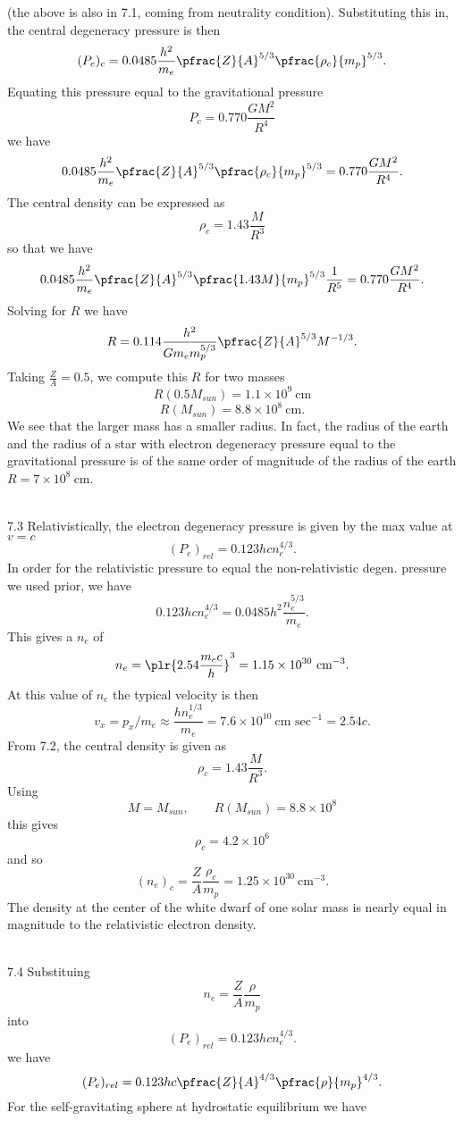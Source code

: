 \documentclass[10pt,letterpaper]{article}
\begin{document}
(the above is also in 7.1, coming from neutrality condition). Substituting this in, the central degeneracy pressure is then
\[
	(P_e)_c = 0.0485 \frac{h^2}{m_e} \pfrac{Z}{A}^{5/3} \pfrac{\rho_c}{m_p}^{5/3}.
\]
Equating this pressure equal to the gravitational pressure 
\[
	P_c = 0.770 \frac{GM^2}{R^4}
\]
we have
\[
	0.0485 \frac{h^2}{m_e} \pfrac{Z}{A}^{5/3} \pfrac{\rho_c}{m_p}^{5/3}= 0.770 \frac{GM^2}{R^4}.
\]
The central density can be expressed as
\[
	\rho_c = 1.43 \frac{M}{R^3}
\] so that we have
\[
	0.0485 \frac{h^2}{m_e} \pfrac{Z}{A}^{5/3} \pfrac{1.43 M}{m_p}^{5/3}\frac{1}{R^5}= 0.770 \frac{GM^2}{R^4}.
\]
Solving for $R$ we have
\[
	R = 0.114 \frac{h^2}{Gm_e m_p^{5/3}}\pfrac{Z}{A}^{5/3} M^{-1/3}.
\]
Taking $\frac ZA = 0.5$, we compute this $R$ for two masses
\[
	R(0.5M_{sun}) = 1.1\times 10^9\ \text{cm}
\]
\[
	R(M_{sun}) = 8.8\times 10^8\ \text{cm}.
\]
We see that the larger mass has a smaller radius. In fact, the radius of the earth and the radius of a star with electron degeneracy pressure equal to the gravitational pressure is of the same order of magnitude of the radius of the earth $R = 7\times10^{8}\ \text{cm}$. 
\\ \\
\item[7.3]
Relativistically, the electron degeneracy pressure is given by the max value at $v=c$
\[
	(P_e)_{rel} = 0.123 hc n_e^{4/3}.
\]
In order for the relativistic pressure to equal the non-relativistic degen. pressure we used prior, we have
\[
	 0.123 hc n_e^{4/3} = 0.0485 h^2 \frac{n_e^{5/3}}{m_e}.
\]
This gives a $n_e$ of
\[
	n_e = \plr{ 2.54 \frac{m_e c}{h}}^3 = 1.15\times 10^{30}\ \text{cm}^{-3}.
\]
At this value of $n_e$ the typical velocity is then 
\[
	v_x = p_x/m_e \approx \frac{h n_e^{1/3}}{m_e} = 7.6\times 10^{10}\ \text{cm sec}^{-1} = 2.54 c.
\]
From 7.2, the central density is given as
\[
	\rho_c = 1.43 \frac{M}{R^3}.
\]
Using 
\[
	M = M_{sun},\qquad R(M_{sun}) = 8.8\times 10^{8}
\]
this gives
\[
	\rho_c = 4.2\times 10^6
\]
and so
\[
	(n_e)_c = \frac{Z}{A} \frac{\rho_c}{m_p} = 1.25\times 10^{30}\ \text{cm}^{-3}.
\]
The density at the center of the white dwarf of one solar mass is nearly equal in magnitude 
to the relativistic electron density.
\\ \\
\item[7.4]
Substituing 
\[
	n_e = \frac ZA \frac{\rho}{m_p}
\]
into
\[
	(P_e)_{rel} = 0.123 hc n_e^{4/3}.
\]
we have
\[
	(P_e)_{rel} = 0.123 hc \pfrac{Z}{A}^{4/3}\pfrac{\rho}{m_p}^{4/3}.
\]
For the self-gravitating sphere at hydrostatic equilibrium we have
\end{document}
